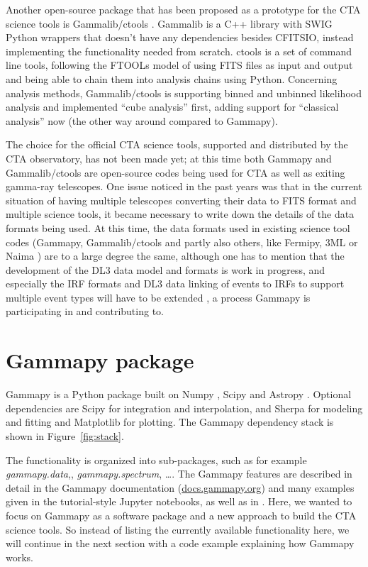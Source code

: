 \documentclass{PoS}
\newcommand{\urlGammapyDocs}{\href{http://docs.gammapy.org}{docs.gammapy.org}}
\begin{document}
Another open-source package that has been proposed as a prototype for the CTA
science tools is Gammalib/ctools \cite{ctools}. Gammalib is a C++ library with
SWIG Python wrappers that doesn't have any dependencies besides CFITSIO, instead
implementing the functionality needed from scratch. ctools is a set of command
line tools, following the FTOOLs model of using FITS files as input and output
and being able to chain them into analysis chains using Python. Concerning
analysis methods, Gammalib/ctools is supporting binned and unbinned likelihood
analysis and implemented ``cube analysis'' first, adding support for ``classical
analysis'' now (the other way around compared to Gammapy).

The choice for the official CTA science tools, supported and distributed by the
CTA observatory, has not been made yet; at this time both Gammapy and
Gammalib/ctools are open-source codes being used for CTA as well as exiting
gamma-ray telescopes. One issue noticed in the past years was that in the
current situation of having multiple telescopes converting their data to FITS
format and multiple science tools, it became necessary to write down the details
of the data formats being used. At this time, the data formats used in existing
science tool codes (Gammapy, Gammalib/ctools and partly also others, like
Fermipy, 3ML \cite{3ml} or Naima \cite{naima}) are to a large degree the same,
although one has to mention that the development of the DL3 data model and
formats is work in progress, and especially the IRF formats and DL3 data linking
of events to IRFs to support multiple event types will have to be extended
\cite{opendata}, a process Gammapy is participating in and contributing to.

\section{Gammapy package}
\label{sec:gammapy}

Gammapy is a Python package built on Numpy \cite{numpy}, Scipy \cite{scipy} and
Astropy \cite{astropy}. Optional dependencies are Scipy for integration and
interpolation, and Sherpa \cite{sherpa2001, sherpa2009, sherpa2011} for modeling
and fitting and Matplotlib \cite{matplotlib} for plotting. The Gammapy
dependency stack is shown in Figure~\ref{fig:stack}.

The functionality is organized into sub-packages, such as for example {\it
gammapy.data},, {\it gammapy.spectrum}, \ldots . The
Gammapy features are described in detail in the Gamma\-py documentation
(\urlGammapyDocs) and many examples given in the tutorial-style Jupyter
notebooks, as well as in \cite{gammapy-icrc2015}. Here, we wanted to focus on
Gammapy as a software package and a new approach to build the CTA science tools.
So instead of listing the currently available functionality here, we will
continue in the next section with a code example explaining how Gammapy works.
\end{document}
